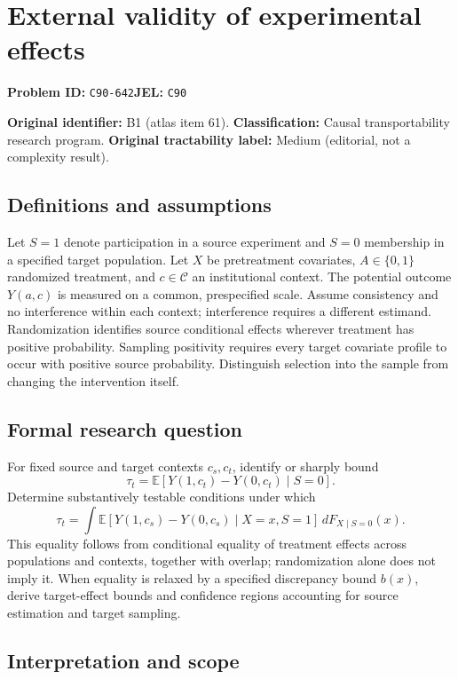 \documentclass[11pt,a4paper]{article}
\begin{document}
\section*{External validity of experimental effects}
\textbf{Problem ID:} \texttt{C90-642}\quad \textbf{JEL:} \texttt{C90}\par
\label{problem:OP-0061}
\label{atlas:prob:B1}

\noindent\textbf{Original identifier:} B1 (atlas item 61). \textbf{Classification:} Causal transportability research program. \textbf{Original tractability label:} Medium (editorial, not a complexity result).

\subsection*{Definitions and assumptions}

Let $S=1$ denote participation in a source experiment and $S=0$ membership in a specified target population. Let $X$ be pretreatment covariates, $A\in\{0,1\}$ randomized treatment, and $c\in\mathcal C$ an institutional context. The potential outcome $Y(a,c)$ is measured on a common, prespecified scale. Assume consistency and no interference within each context; interference requires a different estimand. Randomization identifies source conditional effects wherever treatment has positive probability. Sampling positivity requires every target covariate profile to occur with positive source probability. Distinguish selection into the sample from changing the intervention itself.

\subsection*{Formal research question}

For fixed source and target contexts $c_s,c_t$, identify or sharply bound
\[
\tau_t=\mathbb E[Y(1,c_t)-Y(0,c_t)\mid S=0].
\]
Determine substantively testable conditions under which
\[
\tau_t=\int \mathbb E[Y(1,c_s)-Y(0,c_s)\mid X=x,S=1]\,dF_{X\mid S=0}(x).
\]
This equality follows from conditional equality of treatment effects across populations and contexts, together with overlap; randomization alone does not imply it. When equality is relaxed by a specified discrepancy bound $b(x)$, derive target-effect bounds and confidence regions accounting for source estimation and target sampling.

\subsection*{Interpretation and scope}
\end{document}

